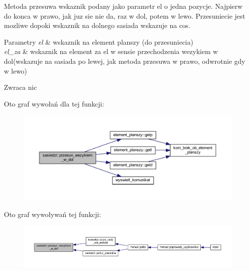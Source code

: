 Metoda przesuwa wskaznik podany jako parametr el o jedna pozycje. Najpierw do konca w prawo, jak juz sie nie da, raz w dol, potem w lewo. Przesuniecie jest mozliwe dopoki wskaznik na dolnego sasiada wskazuje na cos. 
\begin{DoxyParams}{Parametry}
{\em el} & wskaznik na element planszy (do przesuniecia) \\
\hline
{\em el\+\_\+za} & wskaznik na element za el w sensie przechodzenia wezykiem w dol(wskazuje na sasiada po lewej, jak metoda przesuwa w prawo, odwrotnie gdy w lewo) \\
\hline
\end{DoxyParams}
\begin{DoxyReturn}{Zwraca}
nic 
\end{DoxyReturn}
Oto graf wywołań dla tej funkcji\+:
\nopagebreak
\begin{figure}[H]
\begin{center}
\leavevmode
\includegraphics[width=350pt]{classsasiedzi_a5f50acc6fb740edf64619f2d3976dcb9_cgraph}
\end{center}
\end{figure}
Oto graf wywoływań tej funkcji\+:
\nopagebreak
\begin{figure}[H]
\begin{center}
\leavevmode
\includegraphics[width=350pt]{classsasiedzi_a5f50acc6fb740edf64619f2d3976dcb9_icgraph}
\end{center}
\end{figure}
\mbox{\label{classsasiedzi_a1c5e1efc2810b7d408012cf3a82cf719}} 

